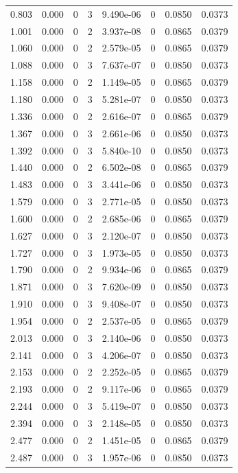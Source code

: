 \documentclass[preview]{standalone}
\begin{document}
{{\begin{tabular}{L{1.2cm}C{1.2cm} C{0.3cm}C{0.5cm} C{1.4cm}C{1.4cm} C{1.4cm}C{1.4cm}}
  0.803  &  0.000  & 0     &  3 &  9.490e-06  & 0  & 0.0850 &  0.0373   \\ 
  1.001  &  0.000  & 0     &  2 &  3.937e-08  & 0  & 0.0865 &  0.0379   \\ 
  1.060  &  0.000  & 0     &  2 &  2.579e-05  & 0  & 0.0865 &  0.0379   \\ 
  1.088  &  0.000  & 0     &  3 &  7.637e-07  & 0  & 0.0850 &  0.0373   \\ 
  1.158  &  0.000  & 0     &  2 &  1.149e-05  & 0  & 0.0865 &  0.0379   \\ 
  1.180  &  0.000  & 0     &  3 &  5.281e-07  & 0  & 0.0850 &  0.0373   \\ 
  1.336  &  0.000  & 0     &  2 &  2.616e-07  & 0  & 0.0865 &  0.0379   \\ 
  1.367  &  0.000  & 0     &  3 &  2.661e-06  & 0  & 0.0850 &  0.0373   \\ 
  1.392  &  0.000  & 0     &  3 &  5.840e-10  & 0  & 0.0850 &  0.0373   \\ 
  1.440  &  0.000  & 0     &  2 &  6.502e-08  & 0  & 0.0865 &  0.0379   \\ 
  1.483  &  0.000  & 0     &  3 &  3.441e-06  & 0  & 0.0850 &  0.0373   \\ 
  1.579  &  0.000  & 0     &  3 &  2.771e-05  & 0  & 0.0850 &  0.0373   \\ 
  1.600  &  0.000  & 0     &  2 &  2.685e-06  & 0  & 0.0865 &  0.0379   \\ 
  1.627  &  0.000  & 0     &  3 &  2.120e-07  & 0  & 0.0850 &  0.0373   \\ 
  1.727  &  0.000  & 0     &  3 &  1.973e-05  & 0  & 0.0850 &  0.0373   \\ 
  1.790  &  0.000  & 0     &  2 &  9.934e-06  & 0  & 0.0865 &  0.0379   \\ 
  1.871  &  0.000  & 0     &  3 &  7.620e-09  & 0  & 0.0850 &  0.0373   \\ 
  1.910  &  0.000  & 0     &  3 &  9.408e-07  & 0  & 0.0850 &  0.0373   \\ 
  1.954  &  0.000  & 0     &  2 &  2.537e-05  & 0  & 0.0865 &  0.0379   \\ 
  2.013  &  0.000  & 0     &  3 &  2.140e-06  & 0  & 0.0850 &  0.0373   \\ 
  2.141  &  0.000  & 0     &  3 &  4.206e-07  & 0  & 0.0850 &  0.0373   \\ 
  2.153  &  0.000  & 0     &  2 &  2.252e-05  & 0  & 0.0865 &  0.0379   \\ 
  2.193  &  0.000  & 0     &  2 &  9.117e-06  & 0  & 0.0865 &  0.0379   \\ 
  2.244  &  0.000  & 0     &  3 &  5.419e-07  & 0  & 0.0850 &  0.0373   \\ 
  2.394  &  0.000  & 0     &  3 &  2.148e-05  & 0  & 0.0850 &  0.0373   \\ 
  2.477  &  0.000  & 0     &  2 &  1.451e-05  & 0  & 0.0865 &  0.0379   \\ 
  2.487  &  0.000  & 0     &  3 &  1.957e-06  & 0  & 0.0850 &  0.0373   \\ 
\hline 
\end{tabular} 

}}
\end{document}
